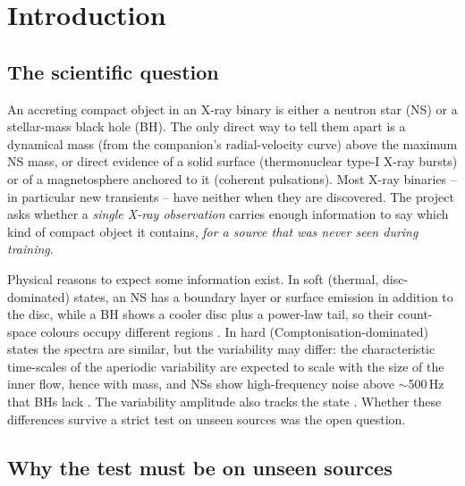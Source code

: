 \chapter{Introduction}\label{ch:intro}

\section{The scientific question}\label{sec:question}

An accreting compact object in an X-ray binary is either a neutron star (NS) or a stellar-mass black hole (BH). The
only direct way to tell them apart is a dynamical mass (from the companion's radial-velocity curve) above the maximum NS
mass, or direct evidence of a solid surface (thermonuclear type-I X-ray bursts) or of a magnetosphere anchored to it
(coherent pulsations). Most X-ray binaries -- in particular new transients -- have neither when they are discovered. The
project asks whether a \emph{single X-ray observation} carries enough information to say which kind of compact object it
contains, \emph{for a source that was never seen during training}.

Physical reasons to expect some information exist. In soft (thermal, disc-dominated) states, an NS has a boundary layer
or surface emission in addition to the disc, while a BH shows a cooler disc plus a power-law tail, so their count-space
colours occupy different regions \citep[e.g.][]{DoneGierlinski2003}. In hard (Comptonisation-dominated) states the spectra
are similar, but the variability may differ: the characteristic time-scales of the aperiodic variability are expected to
scale with the size of the inner flow, hence with mass, and NSs show high-frequency noise above $\sim$500\,Hz that BHs lack
\citep{SunyaevRevnivtsev2000}. The variability amplitude also tracks the state \citep{RemillardMcClintock2006,MunozDarias2011}.
Whether these differences survive a strict test on unseen sources was the open question.

\section{Why the test must be on unseen sources}\label{sec:unseen}


